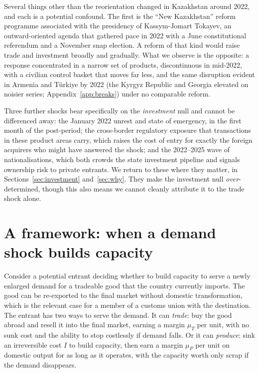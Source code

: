\documentclass[12pt]{article}
\begin{document}
Several things other than the reorientation changed in Kazakhstan around 2022, and each is a
potential confound. The first is the ``New Kazakhstan'' reform programme associated with the
presidency of Kassym-Jomart Tokayev, an outward-oriented agenda that gathered pace in 2022
with a June constitutional referendum and a November snap election. A reform of that kind would
raise trade and investment broadly and gradually. What we observe is the opposite: a response
concentrated in a narrow set of products, discontinuous in mid-2022, with a civilian control
basket that moves far less, and the same disruption evident in Armenia and T\"urkiye by 2022
(the Kyrgyz Republic and Georgia elevated on noisier series; Appendix~\ref{app:breaks}) under no
comparable reform.

Three further shocks bear specifically on the \emph{investment} null and cannot be differenced
away: the January 2022 unrest and state of emergency, in the first month of
the post-period; the cross-border regulatory exposure that transactions in these product areas carry, which raises the cost of entry for exactly the foreign acquirers who might have answered the shock;
and the 2022--2025 wave of nationalisations, which both crowds the state investment pipeline and
signals ownership risk to private entrants. We return to these where they matter, in
Sections~\ref{sec:investment} and~\ref{sec:why}. They make the investment null
\emph{over}-determined, though this also means we cannot cleanly attribute it
to the trade shock alone.

\section{A framework: when a demand shock builds capacity}\label{sec:framework}

Consider a potential entrant deciding whether to build capacity to serve a newly enlarged
demand for a tradeable good that the country currently imports. The good can be re-exported to
the final market without domestic transformation, which is the relevant case for a member of a
customs union with the destination. The entrant has two ways to serve the demand. It can
\emph{trade}: buy the good abroad and resell it into the final market, earning a margin
$\mu_T$ per unit, with no sunk cost and the ability to stop costlessly if demand falls. Or it
can \emph{produce}: sink an irreversible cost $I$ to build capacity, then earn a margin
$\mu_P$ per unit on domestic output for as long as it operates, with the capacity worth only
scrap if the demand disappears.
\end{document}
